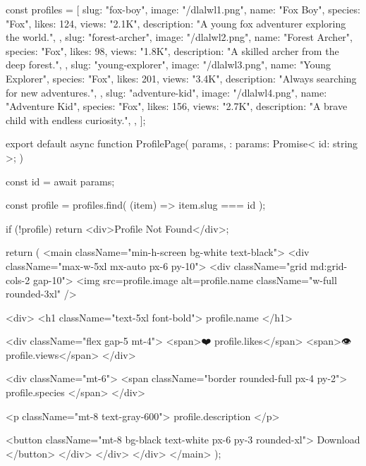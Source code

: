 const profiles = [
  {
    slug: "fox-boy",
    image: "/dlalwl1.png",
    name: "Fox Boy",
    species: "Fox",
    likes: 124,
    views: "2.1K",
    description: "A young fox adventurer exploring the world.",
  },
  {
    slug: "forest-archer",
    image: "/dlalwl2.png",
    name: "Forest Archer",
    species: "Fox",
    likes: 98,
    views: "1.8K",
    description: "A skilled archer from the deep forest.",
  },
  {
    slug: "young-explorer",
    image: "/dlalwl3.png",
    name: "Young Explorer",
    species: "Fox",
    likes: 201,
    views: "3.4K",
    description: "Always searching for new adventures.",
  },
  {
    slug: "adventure-kid",
    image: "/dlalwl4.png",
    name: "Adventure Kid",
    species: "Fox",
    likes: 156,
    views: "2.7K",
    description: "A brave child with endless curiosity.",
  },
];

export default async function ProfilePage({
  params,
}: {
  params: Promise<{ id: string }>;
}) {
  const { id } = await params;

  const profile = profiles.find(
    (item) => item.slug === id
  );

  if (!profile) {
    return <div>Profile Not Found</div>;
  }

  return (
    <main className="min-h-screen bg-white text-black">
      <div className="max-w-5xl mx-auto px-6 py-10">
        <div className="grid md:grid-cols-2 gap-10">
          <img
            src={profile.image}
            alt={profile.name}
            className="w-full rounded-3xl"
          />

          <div>
            <h1 className="text-5xl font-bold">
              {profile.name}
            </h1>

            <div className="flex gap-5 mt-4">
              <span>❤️ {profile.likes}</span>
              <span>👁 {profile.views}</span>
            </div>

            <div className="mt-6">
              <span className="border rounded-full px-4 py-2">
                {profile.species}
              </span>
            </div>

            <p className="mt-8 text-gray-600">
              {profile.description}
            </p>

            <button className="mt-8 bg-black text-white px-6 py-3 rounded-xl">
              Download
            </button>
          </div>
        </div>
      </div>
    </main>
  );
}